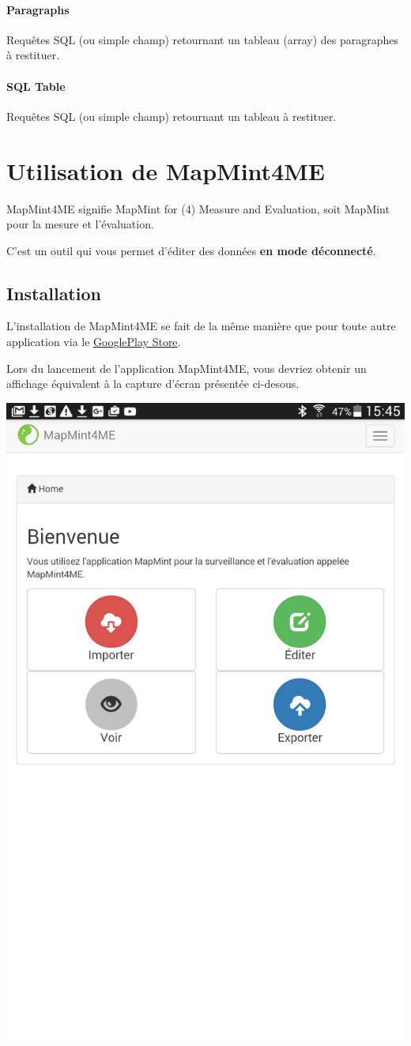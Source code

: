 \documentclass[letterpaper,10pt,french]{sphinxmanual}
\begin{document}
\paragraph{Paragraphs}
\label{tables/infopanel:paragraphs}
Requêtes SQL (ou simple champ) retournant un tableau (array) des
paragraphes à restituer.


\paragraph{SQL Table}
\label{tables/infopanel:sql-table}
Requêtes SQL (ou simple champ) retournant un tableau à restituer.


\section{Utilisation de MapMint4ME}
\label{tables/mapmint4me:tables-mm4me}\label{tables/mapmint4me::doc}\label{tables/mapmint4me:utilisation-de-mapmint4me}
MapMint4ME signifie MapMint for (4) Measure and Evaluation, soit MapMint pour
la mesure et l'évaluation.

C'est un outil qui vous permet d'éditer des données \textbf{en mode déconnecté}.


\subsection{Installation}
\label{tables/mapmint4me:installation}
L'installation de MapMint4ME se fait de la même manière que pour toute autre application via le \href{https://play.google.com/store/apps/details?id=fr.geolabs.dev.mapmint4me}{GooglePlay Store}.

Lors du lancement de l'application MapMint4ME, vous devriez obtenir un affichage équivalent à la capture d'écran présentée ci-desous.

{\hfill\includegraphics[width=0.450\linewidth]{mm4me-welcome.png}\hfill}
\end{document}
